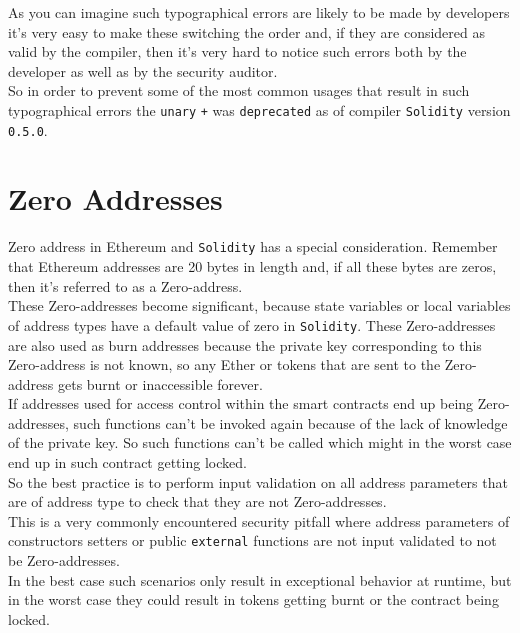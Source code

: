 As you can imagine such typographical errors are likely to be made by developers it's very easy to make these switching the order and, if they are considered as valid by the compiler, then it's very hard to notice such errors both by the developer as well as by the security auditor. \\

So in order to prevent some of the most common usages that result in such typographical errors the \texttt{unary} \texttt{+} was \texttt{deprecated} as of compiler \texttt{Solidity} version \texttt{0.5.0}.

\section{Zero Addresses}

Zero address in Ethereum and \texttt{Solidity} has a special consideration. Remember that Ethereum addresses are 20 bytes in length and, if all these bytes are zeros, then it's referred to as a Zero-address. \\

These Zero-addresses become significant, because state variables or local variables of address types have a default value of zero in \texttt{Solidity}. These Zero-addresses are also used as burn addresses because the private key corresponding to this Zero-address is not known, so any Ether or tokens that are sent to the Zero-address gets burnt or inaccessible forever.\\

If addresses used for access control within the smart contracts end up being Zero-addresses, such functions can't be invoked again because of the lack of knowledge of the private key. So such functions can't be called which might in the worst case end up in such contract getting locked.\\

So the best practice is to perform input validation on all address parameters that are of address type to check that they are not Zero-addresses.\\

This is a very commonly encountered security pitfall where address parameters of constructors setters or public \texttt{external} functions are not input validated to not be Zero-addresses.\\

In the best case such scenarios only result in exceptional behavior at runtime, but in the worst case they could result in tokens getting burnt or the contract being locked.

